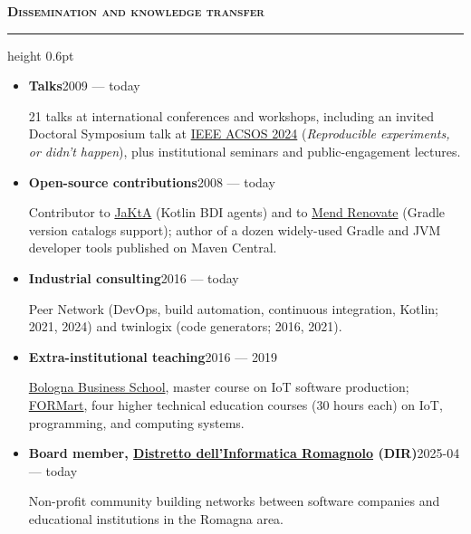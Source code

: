 \documentclass[a4paper,9pt]{extarticle}
\newcommand{\cvsection}[1]{%
  \par\vspace{3.5pt}%
  {\normalsize\bfseries\scshape #1}\par\vspace{1pt}%
  \hrule height 0.6pt\vspace{2.5pt}\par}
\newcommand{\entry}[2]{\textbf{#1}\hspace{1em}\hfill{\small #2}\par}
\begin{document}
\cvsection{Dissemination and knowledge transfer}
\begin{itemize}
\item \entry{Talks}{2009 --- today}
      21 talks at international conferences and workshops, including an invited Doctoral
      Symposium talk at \href{https://2024.acsos.org/}{IEEE ACSOS 2024}
      (\emph{Reproducible experiments, or didn't happen}), plus institutional seminars and
      public-engagement lectures.
\item \entry{Open-source contributions}{2008 --- today}
      Contributor to \href{https://jakta-bdi.github.io/}{JaKtA} (Kotlin BDI agents) and to
      \href{https://github.com/renovatebot/renovate}{Mend Renovate} (Gradle version catalogs
      support); author of a dozen widely-used Gradle and JVM developer tools published on
      Maven Central.
\item \entry{Industrial consulting}{2016 --- today}
      Peer Network (DevOps, build automation, continuous integration, Kotlin; 2021, 2024)
      and twinlogix (code generators; 2016, 2021).
\item \entry{Extra-institutional teaching}{2016 --- 2019}
      \href{https://www.bbs.unibo.eu/hp/}{Bologna Business School}, master course on IoT
      software production; \href{http://www.formart.it/}{FORMart}, four higher technical
      education courses (30 hours each) on IoT, programming, and computing systems.
\item \entry{Board member, \href{https://www.distrettodellinformaticaromagnolo.org/}{Distretto dell'Informatica Romagnolo} (DIR)}{2025-04 --- today}
      Non-profit community building networks between software companies and educational
      institutions in the Romagna area.
\end{itemize}
\end{document}
